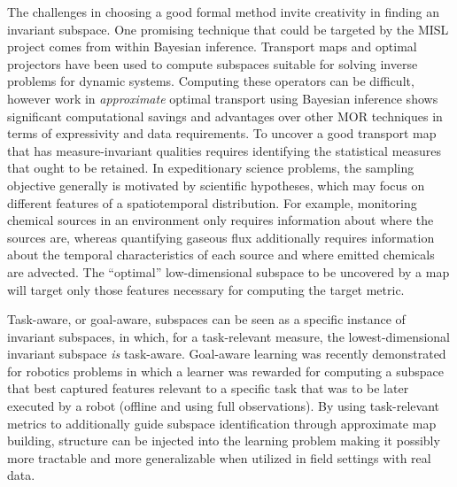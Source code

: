 The challenges in choosing a good formal method invite creativity in finding an invariant subspace.
One promising technique that could be targeted by the MISL project comes from within Bayesian inference.
Transport maps and optimal projectors have been used to compute subspaces suitable for solving inverse problems for dynamic systems\autocite{cui2014likelihood,spantini2018inference,spantini2015optimal}.
Computing these operators can be difficult, however work in \emph{approximate} optimal transport using Bayesian inference\autocite{spantini2018inference,spantini2019coupling,zahm2018certified,villani2008optimal,bigoni2019greedy} shows significant computational savings and advantages over other MOR techniques in terms of expressivity and data requirements.
To uncover a good transport map that has measure-invariant qualities requires identifying the statistical measures that ought to be retained.
In expeditionary science problems, the sampling objective generally is motivated by scientific hypotheses, which may focus on different features of a spatiotemporal distribution.
For example, monitoring chemical sources in an environment only requires information about where the sources are, whereas quantifying gaseous flux additionally requires information about the temporal characteristics of each source and where emitted chemicals are advected.
The ``optimal'' low-dimensional subspace to be uncovered by a map will target only those features necessary for computing the target metric.

Task-aware, or goal-aware, subspaces can be seen as a specific instance of invariant subspaces, in which, for a task-relevant measure, the lowest-dimensional invariant subspace \emph{is} task-aware.
Goal-aware learning was recently demonstrated for robotics problems\autocite{nair2020goal} in which a learner was rewarded for computing a subspace that best captured features relevant to a specific task that was to be later executed by a robot (offline and using full observations).
By using task-relevant metrics to additionally guide subspace identification through approximate map building, structure can be injected into the learning problem making it possibly more tractable and more generalizable when utilized in field settings with real data.


